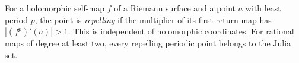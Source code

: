 
For a holomorphic self-map $f$ of a Riemann surface and a point $a$ with least period $p$, the point is \emph{repelling} if the multiplier of its first-return map has $|(f^p)'(a)|>1$. This is independent of holomorphic coordinates. For rational maps of degree at least two, every repelling periodic point belongs to the Julia set.
